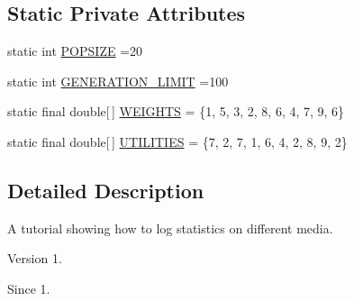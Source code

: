 \subsection*{Static Private Attributes}
\begin{DoxyCompactItemize}
\item 
static int \hyperlink{classjenes_1_1tutorials_1_1old_1_1problem7_1_1_knapsack_logged_problem_a0669f7aedc87625dedebd50a597a2c34}{P\-O\-P\-S\-I\-Z\-E} =20
\item 
static int \hyperlink{classjenes_1_1tutorials_1_1old_1_1problem7_1_1_knapsack_logged_problem_a8eb51136b5f76fd45ed636a1de552f22}{G\-E\-N\-E\-R\-A\-T\-I\-O\-N\-\_\-\-L\-I\-M\-I\-T} =100
\item 
static final double\mbox{[}$\,$\mbox{]} \hyperlink{classjenes_1_1tutorials_1_1old_1_1problem7_1_1_knapsack_logged_problem_af9616ae97f81cd6f09d0f4aef665193d}{W\-E\-I\-G\-H\-T\-S} = \{1, 5, 3, 2, 8, 6, 4, 7, 9, 6\}
\item 
static final double\mbox{[}$\,$\mbox{]} \hyperlink{classjenes_1_1tutorials_1_1old_1_1problem7_1_1_knapsack_logged_problem_a6120b773c7958a4df8f200f3433c5673}{U\-T\-I\-L\-I\-T\-I\-E\-S} = \{7, 2, 7, 1, 6, 4, 2, 8, 9, 2\}
\end{DoxyCompactItemize}


\subsection{Detailed Description}
A tutorial showing how to log statistics on different media.

\begin{DoxyVersion}{Version}
1.
\end{DoxyVersion}
\begin{DoxySince}{Since}
1. 
\end{DoxySince}


